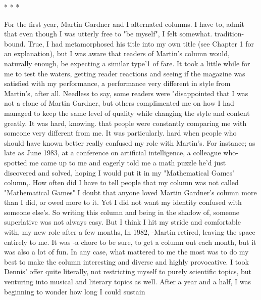                                         *   *   *

        For the first year, Martin Gardner and I alternated columns. I have to, admit
that even though I was utterly free to "be myself", I felt somewhat. tradition-bound.
True, I had metamorphosed his title into my own title (see Chapter 1 for an
explanation), but I was aware that readers of Martin's column would, naturally
enough, be expecting a similar type'1 of fare. It took a little while for me to test the
waters, getting reader reactions and seeing if the magazine was satisfied with my
performance, a performance very different in style from Martin's, after all. Needless
to say, some readers were "disappointed that I was not a clone of Martin Gardner, but
others complimented me on how I had managed to keep the same level of quality
while changing the style and content greatly. It was hard, knowing. that people were
constantly comparing me with someone very different from me. It was particularly.
hard when people who should have known better really confused my role with
Martin's. For instance; as late as June 1983, at a conference on artificial intelligence, a
colleague who-spotted me came up to me and eagerly told me a math puzzle he'd just
discovered and solved, hoping I would put it in my "Mathematical Games" column,.
How often did I have to tell people that my column was not called "Mathematical
Games"
        I doubt that anyone loved Martin Gardner's column more than I did, or owed
more to it. Yet I did not want my identity confused with someone else's. So writing
this column and being in the shadow of, someone superlative was not always easy.
But I think I hit my stride and comfortable with, my new role after a few months,
        In 1982, -Martin retired, leaving the space entirely to me. It was -a chore to be
sure, to get a column out each month, but it was also a lot of fun. In any case, what
mattered to me the most was to do my best to make the column interesting and diverse
and highly provocative. I took Dennis' offer quite literally, not restricting myself to
purely scientific topics, but venturing into musical and literary topics as well.
        After a year and a half, I was beginning to wonder how long I could sustain





